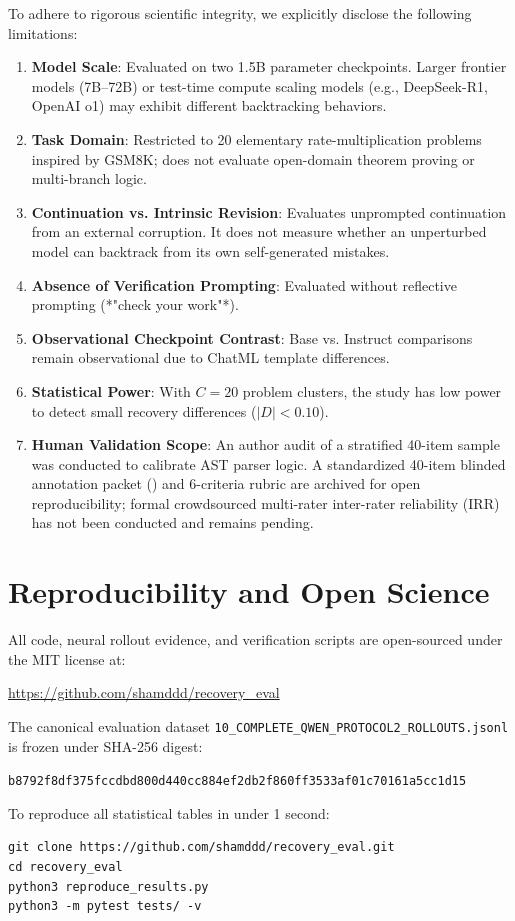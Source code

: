 \documentclass[11pt,letterpaper]{article}
\begin{document}
To adhere to rigorous scientific integrity, we explicitly disclose the following limitations:
\begin{enumerate}[leftmargin=*]
    \item \textbf{Model Scale}: Evaluated on two 1.5B parameter checkpoints. Larger frontier models (7B--72B) or test-time compute scaling models (e.g., DeepSeek-R1, OpenAI o1) may exhibit different backtracking behaviors.
    \item \textbf{Task Domain}: Restricted to 20 elementary rate-multiplication problems inspired by GSM8K; does not evaluate open-domain theorem proving or multi-branch logic.
    \item \textbf{Continuation vs. Intrinsic Revision}: Evaluates unprompted continuation from an external corruption. It does not measure whether an unperturbed model can backtrack from its own self-generated mistakes.
    \item \textbf{Absence of Verification Prompting}: Evaluated without reflective prompting (*"check your work"*).
    \item \textbf{Observational Checkpoint Contrast}: Base vs. Instruct comparisons remain observational due to ChatML template differences.
    \item \textbf{Statistical Power}: With $C=20$ problem clusters, the study has low power to detect small recovery differences ($|D| < 0.10$).
    \item \textbf{Human Validation Scope}: An author audit of a stratified 40-item sample was conducted to calibrate AST parser logic. A standardized 40-item blinded annotation packet () and 6-criteria rubric are archived for open reproducibility; formal crowdsourced multi-rater inter-rater reliability (IRR) has not been conducted and remains pending.
\end{enumerate}

\section{Reproducibility and Open Science}

All code, neural rollout evidence, and verification scripts are open-sourced under the MIT license at:
\begin{center}
\url{https://github.com/shamddd/recovery_eval}
\end{center}
The canonical evaluation dataset \texttt{10\_COMPLETE\_QWEN\_PROTOCOL2\_ROLLOUTS.jsonl} is frozen under SHA-256 digest:
\begin{center}
\texttt{b8792f8df375fccdbd800d440cc884ef2db2f860ff3533af01c70161a5cc1d15}
\end{center}
To reproduce all statistical tables in under 1 second:
\begin{verbatim}
git clone https://github.com/shamddd/recovery_eval.git
cd recovery_eval
python3 reproduce_results.py
python3 -m pytest tests/ -v
\end{verbatim}
\end{document}

